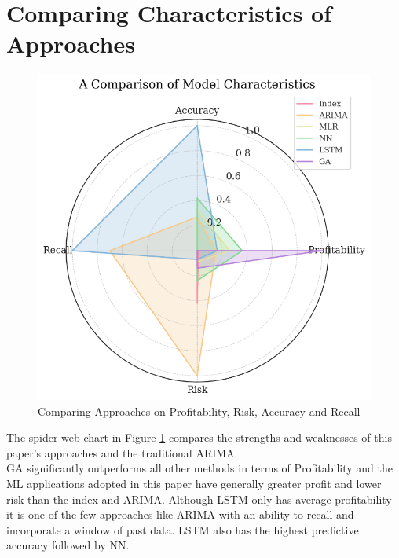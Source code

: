 \documentclass[a4paper,12pt]{report}
\numberwithin{equation}{section}
\theoremstyle{definition}
\begin{document}
\section{Comparing Characteristics of Approaches}
\begin{figure}[H]
  \centerline{\includegraphics[width=15cm]{Final Comparsion of Models}}
  \caption{Comparing Approaches on Profitability, Risk, Accuracy and Recall}
  \label{fig:final_comparison_of_models}
\end{figure}

The spider web chart in Figure \ref{fig:final_comparison_of_models} compares the strengths and weaknesses of this paper's approaches and the traditional ARIMA. \\

GA significantly outperforms all other methods in terms of Profitability and the ML applications adopted in this paper have generally greater profit and lower risk than the index and ARIMA. Although LSTM only has average profitability it is one of the few approaches like ARIMA with an ability to recall and incorporate a window of past data. LSTM also has the highest predictive accuracy followed by NN. 
\end{document}
